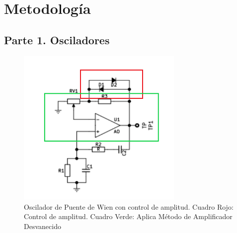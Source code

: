 \section{Metodología}\label{sec:metodologia}
    \subsection{Parte 1. Osciladores}

    \begin{figure}[H]
      \centering
      \includegraphics[width=8cm]{Circuitos/puente_wien_control.png}
      \caption{Oscilador de Puente de Wien con control de amplitud. Cuadro Rojo: Control de amplitud. Cuadro Verde: Aplica Método de Amplificador Desvanecido}
      \label{fig:puente_wien_control}
    \end{figure}

